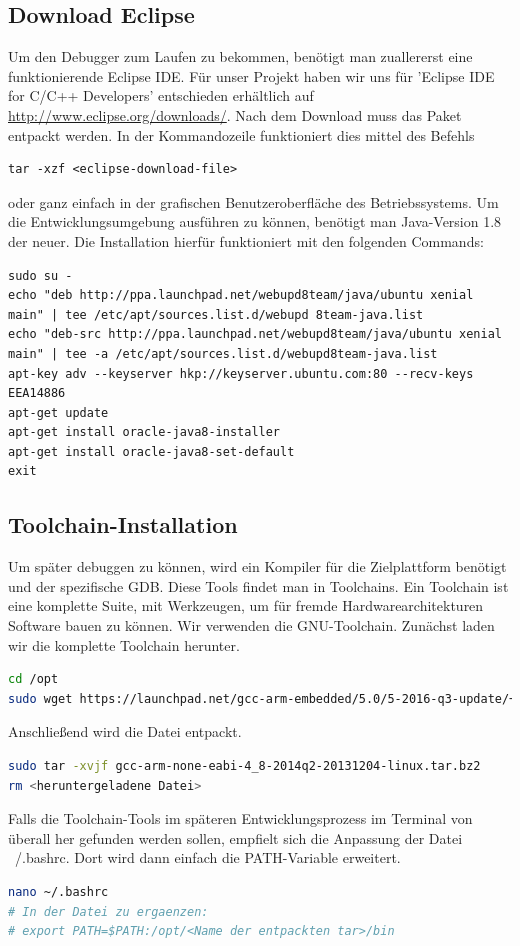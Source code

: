 \documentclass[12pt,a4paper]{article}
\begin{document}
\subsection{Download Eclipse}
Um den Debugger zum Laufen zu bekommen, benötigt man zuallererst eine funktionierende Eclipse IDE. Für unser Projekt haben wir uns für 'Eclipse IDE for C/C++ Developers' entschieden erhältlich auf \url{http://www.eclipse.org/downloads/}.
Nach dem Download muss das Paket entpackt werden. In der Kommandozeile funktioniert dies mittel des Befehls 
\begin{lstlisting} 
tar -xzf <eclipse-download-file>
\end{lstlisting}
oder ganz einfach in der grafischen Benutzeroberfläche des Betriebssystems.
Um die Entwicklungsumgebung ausführen zu können, benötigt man Java-Version 1.8 der neuer. 
Die Installation hierfür funktioniert mit den folgenden Commands:
\begin{lstlisting}
sudo su -
echo "deb http://ppa.launchpad.net/webupd8team/java/ubuntu xenial main" | tee /etc/apt/sources.list.d/webupd 8team-java.list
echo "deb-src http://ppa.launchpad.net/webupd8team/java/ubuntu xenial main" | tee -a /etc/apt/sources.list.d/webupd8team-java.list
apt-key adv --keyserver hkp://keyserver.ubuntu.com:80 --recv-keys EEA14886
apt-get update
apt-get install oracle-java8-installer
apt-get install oracle-java8-set-default
exit

\end{lstlisting}
\subsection{Toolchain-Installation}
Um später debuggen zu können, wird ein Kompiler für die Zielplattform benötigt und der spezifische GDB. Diese Tools findet man in Toolchains. Ein Toolchain ist eine komplette Suite, mit Werkzeugen, um für fremde Hardwarearchitekturen Software bauen zu können.
Wir verwenden die GNU-Toolchain. Zunächst laden wir die komplette Toolchain herunter.
\begin{lstlisting}[language=sh]
cd /opt
sudo wget https://launchpad.net/gcc-arm-embedded/5.0/5-2016-q3-update/+download/gcc-arm-none-eabi-5_4-2016q3-20160926-linux.tar.bz2
\end{lstlisting}
Anschließend wird die Datei entpackt.
\begin{lstlisting}[language=sh]
sudo tar -xvjf gcc-arm-none-eabi-4_8-2014q2-20131204-linux.tar.bz2
rm <heruntergeladene Datei>
\end{lstlisting}
Falls die Toolchain-Tools im späteren Entwicklungsprozess im Terminal von überall her gefunden werden sollen, empfielt sich die Anpassung der Datei ~/.bashrc. Dort wird dann einfach die PATH-Variable erweitert.
\begin{lstlisting}[language=sh]
nano ~/.bashrc
# In der Datei zu ergaenzen:
# export PATH=$PATH:/opt/<Name der entpackten tar>/bin
\end{lstlisting}
\end{document}
